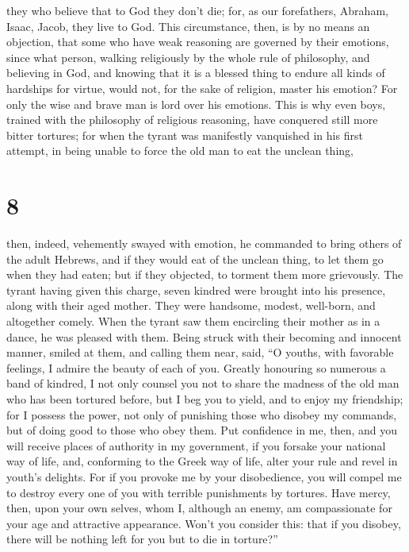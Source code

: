  they who believe that to God they don't die; for, as our
forefathers, Abraham, Isaac, Jacob, they live to God. 
This circumstance, then, is by no means an objection, that some who have
weak reasoning are governed by their emotions,  since
what person, walking religiously by the whole rule of philosophy, and
believing in God,  and knowing that it is a blessed thing
to endure all kinds of hardships for virtue, would not, for the sake of
religion, master his emotion?  For only the wise and
brave man is lord over his emotions.  This is why even
boys, trained with the philosophy of religious reasoning, have conquered
still more bitter tortures;  for when the tyrant was
manifestly vanquished in his first attempt, in being unable to force the
old man to eat the unclean thing,

\hypertarget{section-7}{%
\section{8}\label{section-7}}

 then, indeed, vehemently swayed with emotion, he
commanded to bring others of the adult Hebrews, and if they would eat of
the unclean thing, to let them go when they had eaten; but if they
objected, to torment them more grievously.  The tyrant
having given this charge, seven kindred were brought into his presence,
along with their aged mother. They were handsome, modest, well-born, and
altogether comely.  When the tyrant saw them encircling
their mother as in a dance, he was pleased with them. Being struck with
their becoming and innocent manner, smiled at them, and calling them
near, said,  ``O youths, with favorable feelings, I admire
the beauty of each of you. Greatly honouring so numerous a band of
kindred, I not only counsel you not to share the madness of the old man
who has been tortured before,  but I beg you to yield, and
to enjoy my friendship; for I possess the power, not only of punishing
those who disobey my commands, but of doing good to those who obey them.
 Put confidence in me, then, and you will receive places
of authority in my government, if you forsake your national way of life,
 and, conforming to the Greek way of life, alter your rule
and revel in youth's delights.  For if you provoke me by
your disobedience, you will compel me to destroy every one of you with
terrible punishments by tortures.  Have mercy, then, upon
your own selves, whom I, although an enemy, am compassionate for your
age and attractive appearance.  Won't you consider this:
that if you disobey, there will be nothing left for you but to die in
torture?''

